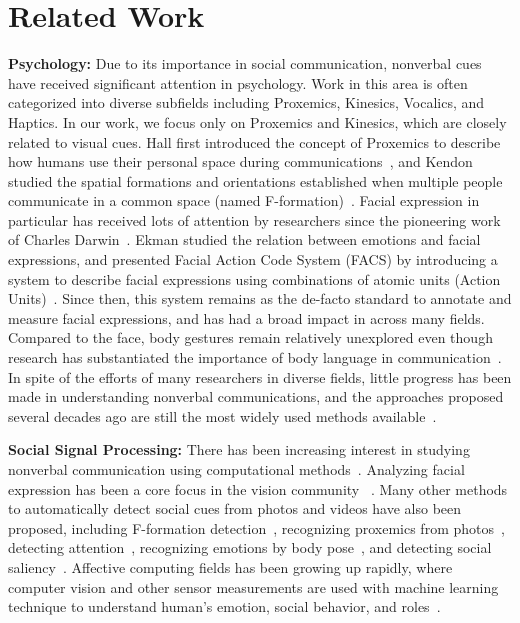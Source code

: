 \section{Related Work}

\textbf{Psychology:}
Due to its importance in social communication, nonverbal cues have received significant attention in psychology. Work in this area is often categorized into diverse subfields including Proxemics, Kinesics, Vocalics, and Haptics. In our work, we focus only on Proxemics and Kinesics, which are closely related to visual cues. Hall first introduced the concept of Proxemics to describe how humans use their personal space during communications~\cite{Hall66}, and Kendon studied the spatial formations and orientations established when multiple people communicate in a common space (named F-formation)~\cite{kendon90}. Facial expression in particular has received lots of attention by researchers since the pioneering work of Charles Darwin~\cite{Darwin-1872}. Ekman studied the relation between emotions and facial expressions, and presented Facial Action Code System (FACS) by introducing a system to describe facial expressions using combinations of atomic units (Action Units)~\cite{ekman1977facial}. Since then, this system remains as the de-facto standard to annotate and measure facial expressions, and has had a broad impact in across many fields. Compared to the face, body gestures remain relatively unexplored even though research has substantiated the importance of body language in communication~\cite{Gelder09, Moore13, Meeren-2005, Aviezer-2012}. In spite of the efforts of many researchers in diverse fields, little progress has been made in understanding nonverbal communications, and the approaches proposed several decades ago are still the most widely used methods available~\cite{Moore13}. %







\textbf{Social Signal Processing:}
There has been increasing interest in studying nonverbal communication using computational methods~\cite{vinciarelli2009social, vinciarelli2012bridging}. Analyzing facial expression has been a core focus in the vision community ~\cite{ChuDC13, Torre15, shan2009facial}. Many other methods to automatically detect social cues from photos and videos have also been proposed, including F-formation detection~\cite{setti2015f}, recognizing proxemics from photos~\cite{yang2012recognizing}, detecting attention~\cite{Fathi-2012}, recognizing emotions by body pose~\cite{schindler2008recognizing}, and detecting social saliency~\cite{park20123d}. Affective computing fields has been growing up rapidly, where computer vision and other sensor measurements are used with machine learning technique to understand human's emotion, social behavior, and roles~\cite{picard1997affective}. 

